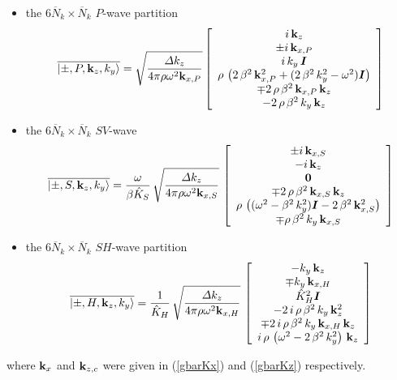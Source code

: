 \begin{itemize}
\item the $6 \overline{N}_k \times \overline{N}_k$ $P$-wave partition
\begin{equation} \label{PxeigenSuper}
\overline{\left|\pm,P, {\bf k}_z,k_{y}  \right\rangle}=
\sqrt{\frac{{\mit \Delta} k_{z}}{{4 \pi \rho {\omega 
}^{  2}{\bf  k}_{  
x, P }}}}
\left[\begin{array}{c} i\,{\bf k}_{z}\\ \pm i\,{\bf k}_{x,P}\\
i\,k_{y}\,{\mbox{\boldmath$\mit I$\unboldmath}}\\
  \rho \,\left( 2\,{\beta^2}\,{{\bf k}_{x,P}^2} + ( 2\,{\beta^2}\,{k_{y}^2} - 
     {\omega^2}){\mbox{\boldmath$\mit I$\unboldmath}} \right) \\ \mp 2\,\rho\,{\beta^2}\,{\bf k}_{x,P}\,{\bf k}_{z} \\
  - 2\,\rho\,{\beta^2}\,k_{y}\,{\bf k}_{z} \end{array}\right]
\end{equation}

\item  the $6 \overline{N}_k \times \overline{N}_k$ $SV$-wave
\begin{equation} \label{SVxeigenSuper}
\overline{\left|\pm,S, {\bf k}_z,k_{y}  \right\rangle}=
\frac{\omega }{\beta \hat{K}_{S}}\,\sqrt{\frac{{\mit \Delta} k_{z}}{{4 \pi \rho {\omega 
}^{  2}{\bf  k}_{  
x, S }}}}\,\left[\begin{array}{c} 
\pm i\,{\bf k}_{x,S}\\
- i\,{\bf k}_{z}\\ {\bf 0} \\
\mp 2\,\rho\,{\beta^2}\,{\bf k}_{x,S}\,{\bf k}_{z} \\
  \rho \,\left(({\omega^2} - {\beta^2}\,{k_{y}^2}) {\mbox{\boldmath$\mit I$\unboldmath}}-2\,{\beta^2}\,{{\bf k}_{x,S}^2}   \right) \\
 \mp \rho\,{\beta^2}\,k_{y}\,{\bf k}_{x,S} \end{array}\right]
\end{equation}

\item the $6 \overline{N}_k \times \overline{N}_k$ $SH$-wave partition
\begin{equation} \label{SHxeigenSuper}
\overline{\left|\pm,H, {\bf k}_z, k_{y}  \right\rangle}=\frac{1 }{\hat{K}_{H}}\,
\sqrt{\frac{{\mit \Delta} k_{z}}{{4 \pi \rho {\omega 
}^{  2}{\bf  k}_{  
x, H }}}}\,\left[\begin{array}{c} 
- k_{y}\,{\bf k}_{z} \\ \mp k_{y}\,{\bf k}_{x,H} \\
  \hat{K}_{H}^2 {\mbox{\boldmath$\mit I$\unboldmath}}\\
-2\,i\,\rho \,{\beta^2}\,k_{y}\,{{\bf k}_{z}^2}\\
  \mp 2\,i\,\rho\,{\beta^2}\,k_{y}\,{\bf k}_{x,H}\,{\bf k}_{z} \\
   i\,\rho\,\left(  {\omega^2} -2\,{\beta^2}\,{k_{y}^2} 
  \right)\,{\bf k}_{z}  \end{array}\right]
\end{equation}

\end{itemize}
where  ${\bf  k}_{x}$ and ${\bf  k}_{z,c}$ were given in
(\ref{gbarKx}) and (\ref{gbarKz}) respectively.

